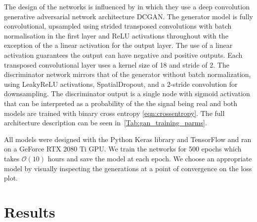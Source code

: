 \documentclass[12pt]{iopart}
\begin{document}
The design of the networks is influenced by \cite{Radford2015} in which they use a deep convolution generative adversarial network architecture \ac{DCGAN}. The generator model is fully convolutional,
upsampled using strided transposed convolutions
with batch normalisation in the
first layer and ReLU activations throughout with the exception of the a linear activation for
the output layer. The use of a linear activation guarantees the output can have negative and positive outputs. Each transposed
convolutional layer uses a kernel size of 18 and stride of 2. The discriminator network
mirrors that of the generator without batch normalization, using
LeakyReLU activations, SpatialDropout, and a 2-stride convolution for
downsampling. The discriminator output is a single node with sigmoid activation that can be interpreted as a probability of the the signal being real and both models are trained with binary cross
entropy \cref{eqn:crossentropy}. The full architecture description can be seen in~\cref{Tab:gan_training_parms}.

All models were designed with the Python Keras library \cite{} and TensorFlow \cite{} and ran on a GeForce RTX 2080 Ti GPU. We train the networks for 500 epochs which takes $\mathcal{O}(10)$ hours and save the model at each epoch. We choose an appropriate model by visually inspecting the generations at a point of convergence on the loss plot. 
\section{Results} \label{results}

\end{document}
